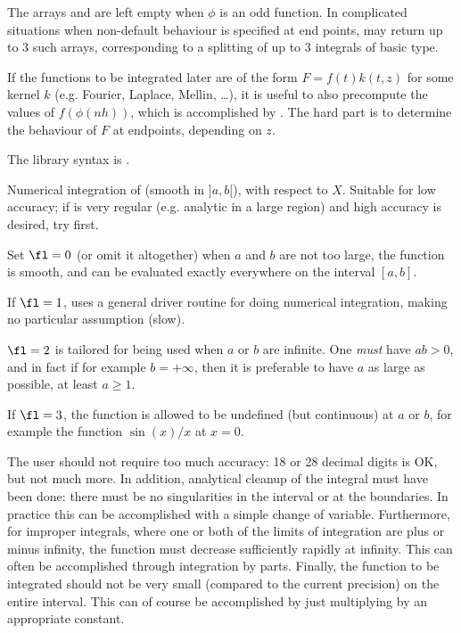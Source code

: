 The arrays  and  are left empty when $\phi$ is an odd
function. In complicated situations when non-default behaviour is specified at
end points,  may return up to $3$ such arrays, corresponding
to a splitting of up to $3$ integrals of basic type.

If the functions to be integrated later are of the form $F = f(t) k(t,z)$
for some kernel $k$ (e.g. Fourier, Laplace, Mellin, \dots), it is
useful to also precompute the values of $f(\phi(nh))$, which is accomplished
by . The hard part is to determine the behaviour
of $F$ at endpoints, depending on $z$.

The library syntax is .

\label{se:intnumromb}
Numerical integration of  (smooth in $]a,b[$), with respect to
$X$. Suitable for low accuracy; if  is very regular (e.g. analytic
in a large region) and high accuracy is desired, try  first.

Set $\fl=0$ (or omit it altogether) when $a$ and $b$ are not too large, the
function is smooth, and can be evaluated exactly everywhere on the interval
$[a,b]$.

If $\fl=1$, uses a general driver routine for doing numerical integration,
making no particular assumption (slow).

$\fl=2$ is tailored for being used when $a$ or $b$ are infinite. One
\emph{must} have $ab>0$, and in fact if for example $b=+\infty$, then it is
preferable to have $a$ as large as possible, at least $a\ge1$.

If $\fl=3$, the function is allowed to be undefined (but continuous) at $a$
or $b$, for example the function $\sin(x)/x$ at $x=0$.

The user should not require too much accuracy: 18 or 28 decimal digits is OK,
but not much more. In addition, analytical cleanup of the integral must have
been done: there must be no singularities in the interval or at the
boundaries. In practice this can be accomplished with a simple change of
variable. Furthermore, for improper integrals, where one or both of the
limits of integration are plus or minus infinity, the function must decrease
sufficiently rapidly at infinity. This can often be accomplished through
integration by parts. Finally, the function to be integrated should not be
very small (compared to the current precision) on the entire interval. This
can of course be accomplished by just multiplying by an appropriate constant.

